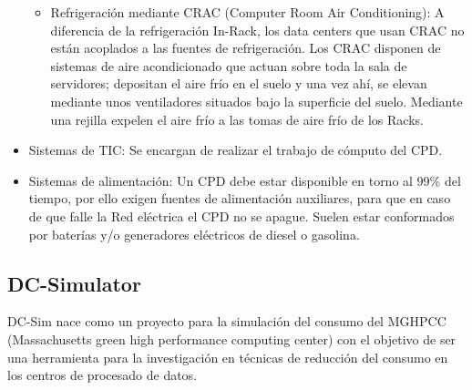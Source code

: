 \begin{itemize}
\begin{itemize}
\begin{enumerate}
\end{enumerate}

\item Refrigeración mediante CRAC (Computer Room Air Conditioning): A diferencia de la refrigeración In-Rack, los data centers que usan CRAC no están acoplados a las fuentes de refrigeración. Los CRAC disponen de sistemas de aire acondicionado que actuan sobre toda la sala de servidores; depositan el aire frío en el suelo y una vez ahí, se elevan mediante unos ventiladores situados bajo la superficie del suelo. Mediante una rejilla expelen el aire frío a las tomas de aire frío de los Racks. 
\end{itemize}
\item Sistemas de TIC: Se encargan de realizar el trabajo de cómputo del CPD. 
\item Sistemas de alimentación: Un CPD debe estar disponible en torno al 99\%  del tiempo, por ello exigen fuentes de alimentación auxiliares, para que en caso de que falle la Red eléctrica el CPD no se apague. Suelen estar conformados por baterías y/o generadores eléctricos de diesel o gasolina.
\end{itemize}

\subsection{DC-Simulator}
DC-Sim nace como un proyecto para la simulación del consumo del MGHPCC (Massachusetts green high performance computing center) con el objetivo de ser una herramienta para la investigación en técnicas de reducción del consumo en los centros de procesado de datos.

